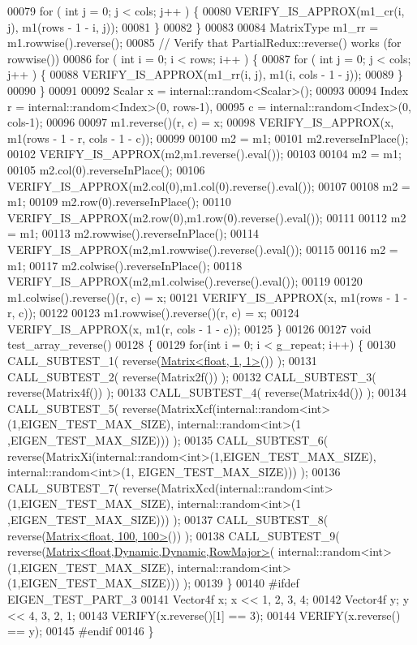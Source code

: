 \begin{DoxyCode}
00079     \textcolor{keywordflow}{for} ( \textcolor{keywordtype}{int} j = 0; j < cols; j++ ) \{
00080       VERIFY\_IS\_APPROX(m1\_cr(i, j), m1(rows - 1 - i, j));
00081     \}
00082   \}
00083 
00084   MatrixType m1\_rr = m1.rowwise().reverse();
00085   \textcolor{comment}{// Verify that PartialRedux::reverse() works (for rowwise())}
00086   \textcolor{keywordflow}{for} ( \textcolor{keywordtype}{int} i = 0; i < rows; i++ ) \{
00087     \textcolor{keywordflow}{for} ( \textcolor{keywordtype}{int} j = 0; j < cols; j++ ) \{
00088       VERIFY\_IS\_APPROX(m1\_rr(i, j), m1(i, cols - 1 - j));
00089     \}
00090   \}
00091 
00092   Scalar x = internal::random<Scalar>();
00093 
00094   Index r = internal::random<Index>(0, rows-1),
00095         c = internal::random<Index>(0, cols-1);
00096 
00097   m1.reverse()(r, c) = x;
00098   VERIFY\_IS\_APPROX(x, m1(rows - 1 - r, cols - 1 - c));
00099   
00100   m2 = m1;
00101   m2.reverseInPlace();
00102   VERIFY\_IS\_APPROX(m2,m1.reverse().eval());
00103   
00104   m2 = m1;
00105   m2.col(0).reverseInPlace();
00106   VERIFY\_IS\_APPROX(m2.col(0),m1.col(0).reverse().eval());
00107   
00108   m2 = m1;
00109   m2.row(0).reverseInPlace();
00110   VERIFY\_IS\_APPROX(m2.row(0),m1.row(0).reverse().eval());
00111   
00112   m2 = m1;
00113   m2.rowwise().reverseInPlace();
00114   VERIFY\_IS\_APPROX(m2,m1.rowwise().reverse().eval());
00115   
00116   m2 = m1;
00117   m2.colwise().reverseInPlace();
00118   VERIFY\_IS\_APPROX(m2,m1.colwise().reverse().eval());
00119 
00120   m1.colwise().reverse()(r, c) = x;
00121   VERIFY\_IS\_APPROX(x, m1(rows - 1 - r, c));
00122 
00123   m1.rowwise().reverse()(r, c) = x;
00124   VERIFY\_IS\_APPROX(x, m1(r, cols - 1 - c));
00125 \}
00126 
00127 \textcolor{keywordtype}{void} test\_array\_reverse()
00128 \{
00129   \textcolor{keywordflow}{for}(\textcolor{keywordtype}{int} i = 0; i < g\_repeat; i++) \{
00130     CALL\_SUBTEST\_1( reverse(\hyperlink{group___core___module_class_eigen_1_1_matrix}{Matrix<float, 1, 1>}()) );
00131     CALL\_SUBTEST\_2( reverse(Matrix2f()) );
00132     CALL\_SUBTEST\_3( reverse(Matrix4f()) );
00133     CALL\_SUBTEST\_4( reverse(Matrix4d()) );
00134     CALL\_SUBTEST\_5( reverse(MatrixXcf(internal::random<int>(1,EIGEN\_TEST\_MAX\_SIZE), internal::random<int>(1
      ,EIGEN\_TEST\_MAX\_SIZE))) );
00135     CALL\_SUBTEST\_6( reverse(MatrixXi(internal::random<int>(1,EIGEN\_TEST\_MAX\_SIZE), internal::random<int>(1,
      EIGEN\_TEST\_MAX\_SIZE))) );
00136     CALL\_SUBTEST\_7( reverse(MatrixXcd(internal::random<int>(1,EIGEN\_TEST\_MAX\_SIZE), internal::random<int>(1
      ,EIGEN\_TEST\_MAX\_SIZE))) );
00137     CALL\_SUBTEST\_8( reverse(\hyperlink{group___core___module_class_eigen_1_1_matrix}{Matrix<float, 100, 100>}()) );
00138     CALL\_SUBTEST\_9( reverse(\hyperlink{group___core___module_class_eigen_1_1_matrix}{Matrix<float,Dynamic,Dynamic,RowMajor>}(
      internal::random<int>(1,EIGEN\_TEST\_MAX\_SIZE), internal::random<int>(1,EIGEN\_TEST\_MAX\_SIZE))) );
00139   \}
00140 \textcolor{preprocessor}{#ifdef EIGEN\_TEST\_PART\_3}
00141   Vector4f x; x << 1, 2, 3, 4;
00142   Vector4f y; y << 4, 3, 2, 1;
00143   VERIFY(x.reverse()[1] == 3);
00144   VERIFY(x.reverse() == y);
00145 \textcolor{preprocessor}{#endif}
00146 \}
\end{DoxyCode}

